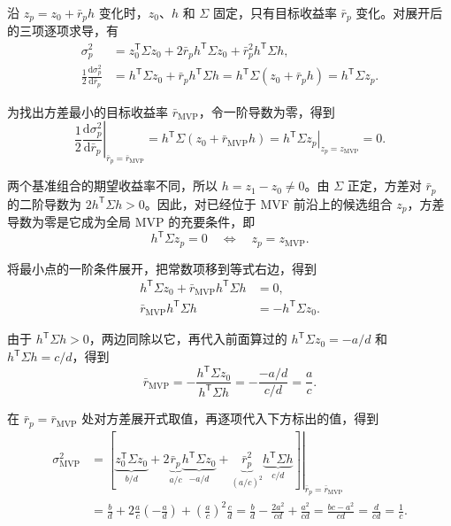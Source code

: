 \begin{solution}[label-content={方法一（沿前沿对展开的二次型求导）},blank-type=none]
沿 $z_p=z_0+\bar r_p h$ 变化时，$z_0$、$h$ 和 $\Sigma$ 固定，只有目标收益率 $\bar r_p$ 变化。对展开后的三项逐项求导，有
\[
 \begin{aligned}
 \sigma_p^2
 &=z_0^{\mathsf T}\Sigma z_0+2\bar r_p h^{\mathsf T}\Sigma z_0
   +\bar r_p^2 h^{\mathsf T}\Sigma h,\\
 \frac12\frac{\mathrm d\sigma_p^2}{\mathrm d\bar r_p}
 &=h^{\mathsf T}\Sigma z_0+\bar r_p h^{\mathsf T}\Sigma h
 =h^{\mathsf T}\Sigma(z_0+\bar r_p h)
 =h^{\mathsf T}\Sigma z_p.
 \end{aligned}
\]

为找出方差最小的目标收益率 $\bar r_{\mathrm{MVP}}$，令一阶导数为零，得到
\[
 \left.\frac12\frac{\mathrm d\sigma_p^2}{\mathrm d\bar r_p}
 \right|_{\bar r_p=\bar r_{\mathrm{MVP}}}
 =h^{\mathsf T}\Sigma(z_0+\bar r_{\mathrm{MVP}}h)
 =\left.h^{\mathsf T}\Sigma z_p\right|_{z_p=z_{\mathrm{MVP}}}=0.
\]

两个基准组合的期望收益率不同，所以 $h=z_1-z_0\ne0$。由 $\Sigma$ 正定，方差对 $\bar r_p$ 的二阶导数为 $2h^{\mathsf T}\Sigma h>0$。因此，对已经位于 MVF 前沿上的候选组合 $z_p$，方差导数为零是它成为全局 MVP 的充要条件，即
\[
 h^{\mathsf T}\Sigma z_p=0
 \quad\Longleftrightarrow\quad
 z_p=z_{\mathrm{MVP}}.
\]

将最小点的一阶条件展开，把常数项移到等式右边，得到
\[
 \begin{aligned}
 h^{\mathsf T}\Sigma z_0
   +\bar r_{\mathrm{MVP}}h^{\mathsf T}\Sigma h&=0,\\
 \bar r_{\mathrm{MVP}}h^{\mathsf T}\Sigma h
   &=-h^{\mathsf T}\Sigma z_0.
 \end{aligned}
\]

由于 $h^{\mathsf T}\Sigma h>0$，两边同除以它，再代入前面算过的 $h^{\mathsf T}\Sigma z_0=-a/d$ 和 $h^{\mathsf T}\Sigma h=c/d$，得到
\[
 \bar r_{\mathrm{MVP}}
 =-\frac{h^{\mathsf T}\Sigma z_0}{h^{\mathsf T}\Sigma h}
 =-\frac{-a/d}{c/d}=\frac ac.
\]

在 $\bar r_p=\bar r_{\mathrm{MVP}}$ 处对方差展开式取值，再逐项代入下方标出的值，得到
\[
 \begin{aligned}
 \sigma_{\mathrm{MVP}}^2
 &=\left.\left[
     \underbrace{z_0^{\mathsf T}\Sigma z_0}_{b/d}
     +2\underbrace{\bar r_p}_{a/c}
        \underbrace{h^{\mathsf T}\Sigma z_0}_{-a/d}
     +\underbrace{\bar r_p^2}_{(a/c)^2}
        \underbrace{h^{\mathsf T}\Sigma h}_{c/d}
   \right]
   \right|_{\bar r_p=\bar r_{\mathrm{MVP}}}\\
 &=\frac bd+2\frac ac\left(-\frac ad\right)
   +\left(\frac ac\right)^2\frac cd
 =\frac bd-\frac{2a^2}{cd}+\frac{a^2}{cd}
 =\frac{bc-a^2}{cd}=\frac{d}{cd}=\frac1c.
 \end{aligned}
\]


\end{solution}
